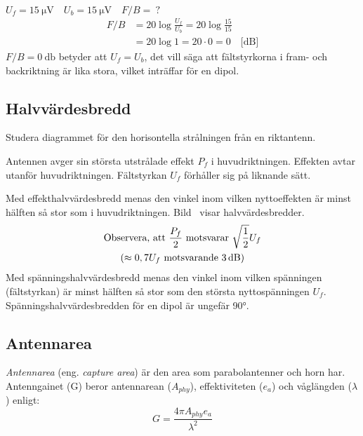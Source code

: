 \begin{exempelbox}
\( U_f = \qty{15}{\micro\volt} \quad U_b = \qty{15}{\micro\volt} \quad F/B =\ ? \)
\tcblower
\begin{align*}
  F/B &= 20 \log\frac{U_f}{U_b} = 20 \log\frac{15}{15} \\
  &= 20 \log 1 = 20 \cdot 0 = 0 \quad \text{[dB]}
\end{align*}
\(F/B = \qty{0}{\decibel}\) betyder att \(U_f = U_b\), det vill säga att
fältstyrkorna i fram- och backriktning är lika stora, vilket inträffar för en
dipol.
\end{exempelbox}

\subsection{Halvvärdesbredd}

Studera diagrammet för den horisontella strålningen från en riktantenn.

Antennen avger sin största utstrålade effekt \(P_f\) i huvudriktningen.
Effekten avtar utanför huvudriktningen.
Fältstyrkan \(U_f\) förhåller sig på liknande sätt.

Med effekthalvvärdesbredd menas den vinkel inom vilken nyttoeffekten
är minst hälften så stor som i huvudriktningen.
Bild~ visar halvvärdesbredder.
\begin{gather*}
  \text{Observera, att } \frac{P_f}{2} \text{ motsvarar }
  \sqrt{\frac{1}{2}}U_f \\
  ( \approx 0,7 U_f \text{ motsvarande \qty{3}{\decibel}})
\end{gather*}
Med spänningshalvvärdesbredd menas den vinkel inom vilken spänningen
(fältstyrkan) är minst hälften så stor som den största nyttospänningen \(U_f\).
Spänningshalvvärdesbredden för en dipol är ungefär \ang{90}.


\subsection{Antennarea}

\emph{Antennarea} (eng. \emph{capture area}) är den area som parabolantenner
och horn har.
Antenngainet (G) beror antennarean (\(A_{phy}\)), effektiviteten (\(e_a\)) och
våglängden (\(\lambda\)) enligt:
\[ G = \frac{4\pi A_{phy}e_a}{\lambda^2} \]
